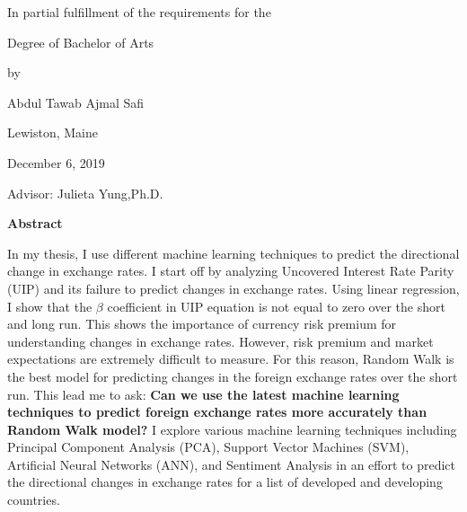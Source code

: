 \documentclass[12pt, a4paper]{report}
\begin{document}
\centerline{\Large In partial fulfillment of the requirements for the}

\vspace*{5mm}
\centerline{\Large Degree of Bachelor of Arts}

\vspace*{5mm}

\centerline{\Large by}

\vspace*{5mm}

\centerline{\Large Abdul Tawab Ajmal Safi}

\vspace*{5mm}

\centerline{\Large Lewiston, Maine}

\vspace*{5mm}

\centerline{\Large December 6, 2019}

\vspace*{16mm}

\centerline{\Large Advisor: Julieta Yung,Ph.D.}

\newpage



\vspace*{0.3cm}

{\LARGE \textbf{Abstract}\par}

\vspace*{6mm}
In my thesis, I use different machine learning techniques to predict the directional change in exchange rates. I start off by analyzing Uncovered Interest Rate Parity (UIP) and its failure to predict changes in exchange rates. Using linear regression, I show that the $\beta$ coefficient in UIP equation is not equal to zero over the short and long run. This shows the importance of currency risk premium for understanding changes in exchange rates. However, risk premium and market expectations are extremely difficult to measure. For this reason, Random Walk is the best model for predicting changes in the foreign exchange rates over the short run. This lead me to ask: \textbf{Can we use the latest machine learning techniques to predict foreign exchange rates more accurately than Random Walk model?} I explore various machine learning techniques including Principal Component Analysis (PCA), Support Vector Machines (SVM), Artificial Neural Networks (ANN), and Sentiment Analysis in an effort to predict the directional changes in exchange rates for a list of developed and developing countries.
\end{document}
